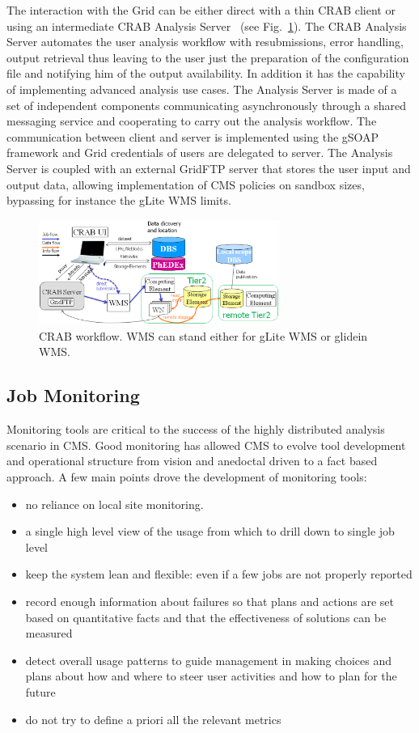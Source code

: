 The interaction with the Grid can be either direct with a thin CRAB client or using an intermediate CRAB Analysis Server~\cite{RefCRAB} (see Fig.~\ref{fig:CRABWorkflow}). The CRAB Analysis Server automates the user analysis workflow with resubmissions, error handling, output retrieval thus leaving to the user just the preparation of the configuration file and notifying him of the output availability. In addition it has the capability of implementing advanced analysis use cases.
The Analysis Server is made of a set of independent components communicating asynchronously through a shared messaging service and cooperating to carry out the analysis workflow. The communication between client and server is implemented using the gSOAP framework and Grid credentials of users are delegated to server.
The Analysis Server is coupled with an external GridFTP server %
 that stores the user input and output data, allowing implementation of CMS policies on sandbox sizes, bypassing for instance the gLite WMS limits.


\begin{figure}
 \includegraphics[width=0.70\textwidth]{CRABWorkflow.eps}
\caption{CRAB workflow. WMS can stand either for gLite WMS or glidein WMS.}
\label{fig:CRABWorkflow}
\end{figure}

\subsection{Job Monitoring}
\label{sec:3_3}
Monitoring tools are critical to the success of the
highly distributed analysis scenario in CMS.
Good monitoring has allowed CMS to evolve tool development
and operational structure from vision and anedoctal driven
to a fact based approach.
A few main points drove the development of monitoring tools:
\begin{itemize}
\item no reliance on local site monitoring.
\item a single  high level view of the usage from which
  to drill down to single job level
\item   keep the system lean and flexible: even if a few
  jobs are not properly reported
\item record
  enough information about failures so that plans and actions are set
  based on quantitative facts and that  the effectiveness of solutions can be measured 
\item detect overall usage patterns to guide management in making
 choices and plans about how and where to steer user activities and
 how to plan for the future
\item do not try to define a priori all the relevant metrics
\end{itemize}

